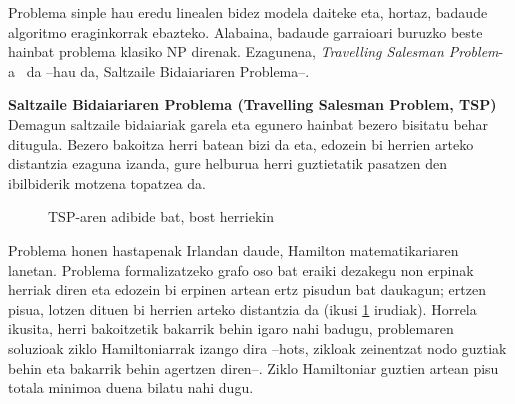 \documentclass[eu]{ifirak}\usepackage[]{graphicx}\usepackage[]{color}
\begin{document}
Problema sinple hau eredu linealen bidez modela daiteke eta, hortaz, badaude algoritmo eraginkorrak ebazteko. Alabaina, badaude garraioari buruzko beste hainbat problema klasiko NP direnak. Ezagunena, \textit{Travelling Salesman Problem}-a~\cite{goldberg1985} da --hau da, Saltzaile Bidaiariaren Problema--. 

\begin{tcolorbox}
\begin{ifexample}{\bf Saltzaile Bidaiariaren Problema (Travelling Salesman Problem, TSP)}
Demagun saltzaile bidaiariak garela eta egunero hainbat bezero bisitatu behar ditugula. Bezero bakoitza herri batean bizi da eta, edozein bi herrien arteko distantzia ezaguna izanda, gure helburua herri guztietatik pasatzen den ibilbiderik motzena topatzea da.
\end{ifexample}
\end{tcolorbox}

\begin{figure}[t]
\centering
{}
\caption{TSP-aren adibide bat, bost herriekin}
\label{fig:tsp}
\end{figure}

Problema honen hastapenak Irlandan daude, Hamilton matematikariaren lanetan. Problema formalizatzeko grafo oso bat eraiki dezakegu non erpinak herriak diren eta edozein bi erpinen artean ertz pisudun bat daukagun; ertzen pisua, lotzen dituen bi herrien arteko distantzia da (ikusi \ref{fig:tsp} irudiak). Horrela ikusita, herri bakoitzetik bakarrik behin igaro nahi badugu, problemaren soluzioak ziklo Hamiltoniarrak izango dira --hots, zikloak zeinentzat nodo guztiak behin eta bakarrik behin agertzen diren--. Ziklo Hamiltoniar guztien artean pisu totala minimoa duena bilatu nahi dugu. 
\end{document}
